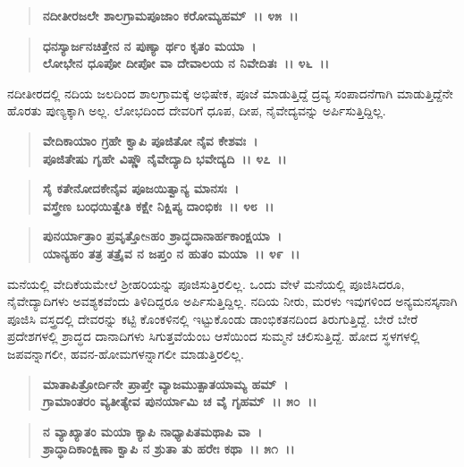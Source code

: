 \begin{verse}
\textbf{ನದೀತೀರಜಲೇ ಶಾಲಗ್ರಾಮಪೂಜಾಂ ಕರೋಮ್ಯಹಮ್~।। ೪೫~।।} 
\end{verse}

\begin{verse}
\textbf{ಧನಸ್ಯಾರ್ಜನಚಿತ್ತೇನ ನ ಪುಣ್ಯಾ ರ್ಥಂ ಕೃತಂ ಮಯಾ~।}\\\textbf{ಲೋಭೇನ ಧೂಪೋ ದೀಪೋ ವಾ ದೇವಾಲಯ ನ ನಿವೇದಿತಃ~।। ೪೬~।।}
\end{verse}

ನದೀತೀರದಲ್ಲಿ ನದಿಯ ಜಲದಿಂದ ಶಾಲಗ್ರಾಮಕ್ಕೆ ಅಭಿಷೇಕ, ಪೂಜೆ ಮಾಡುತ್ತಿದ್ದೆ ದ್ರವ್ಯ ಸಂಪಾದನೆಗಾಗಿ ಮಾಡುತ್ತಿದ್ದೆನೇ ಹೊರತು ಪುಣ್ಯಕ್ಕಾಗಿ ಅಲ್ಲ. ಲೋಭದಿಂದ ದೇವರಿಗೆ ಧೂಪ, ದೀಪ, ನೈವೇದ್ಯವನ್ನು ಅರ್ಪಿಸುತ್ತಿದ್ದಿಲ್ಲ.

\begin{verse}
\textbf{ವೇದಿಕಾಯಾಂ ಗ್ರಹೇ ಕ್ವಾಪಿ ಪೂಜಿತೋ ನೈವ ಕೇಶವಃ~।}\\\textbf{ಪೂಜಿತೇಷು ಗೃಹೇ ವಿಷ್ಣೌ ನೈವೇದ್ಯಾದಿ ಭವೇದ್ಯದಿ~।। ೪೭~।। }
\end{verse}

\begin{verse}
\textbf{ಸೈ ಕತೇನೋದಕೇನೈವ ಪೂಜಯಿತ್ವಾನ್ಯ ಮಾನಸಃ~।}\\\textbf{ವಸ್ತ್ರೇಣ ಬಂಧಯಿತ್ವೇತಿ ಕಕ್ಷೇ ನಿಕ್ಷಿಪ್ಯ ದಾಂಭಿಕಃ~।। ೪೮~।। }
\end{verse}

\begin{verse}
\textbf{ಪುನರ್ಯಾತ್ರಾಂ ಪ್ರವೃತ್ತೋsಹಂ ಶ್ರಾದ್ಧದಾನಾರ್ಹಕಾಂಕ್ಷಯಾ~।}\\\textbf{ಯಾನ್ಯಹಂ ತತ್ರ ತತ್ರೈವ ನ ಜಪ್ತಂ ನ ಹುತಂ ಮಯಾ~।। ೪೯~।।}
\end{verse}

ಮನೆಯಲ್ಲಿ ವೇದಿಕೆಯಮೇಲೆ ಶ‍್ರೀಹರಿಯನ್ನು ಪೂಜಿಸುತ್ತಿರಲಿಲ್ಲ. ಒಂದು ವೇಳೆ ಮನೆಯಲ್ಲಿ ಪೂಜಿಸಿದರೂ, ನೈವೇದ್ಯಾದಿಗಳು ಅವಶ್ಯಕವೆಂದು ತಿಳಿದಿದ್ದರೂ ಅರ್ಪಿಸುತ್ತಿದ್ದಿಲ್ಲ. ನದಿಯ ನೀರು, ಮರಳು ಇವುಗಳಿಂದ ಅನ್ಯಮನಸ್ಕನಾಗಿ ಪೂಜಿಸಿ ವಸ್ತ್ರದಲ್ಲಿ ದೇವರನ್ನು ಕಟ್ಟಿ ಕೊಂಕಳಿನಲ್ಲಿ ಇಟ್ಟುಕೊಂಡು ಡಾಂಭಿಕತನದಿಂದ ತಿರುಗುತ್ತಿದ್ದೆ. ಬೇರೆ ಬೇರೆ ಪ್ರದೇಶಗಳಲ್ಲಿ ಶ್ರಾದ್ಧದ ದಾನಾದಿಗಳು ಸಿಗುತ್ತವೆಯೆಂಬ ಆಸೆಯಿಂದ ಸುಮ್ಮನೆ ಚಲಿಸುತ್ತಿದ್ದೆ. ಹೋದ ಸ್ಥಳಗಳಲ್ಲಿ ಜಪವನ್ನಾಗಲೀ, ಹವನ-ಹೋಮಗಳನ್ನಾಗಲೀ ಮಾಡುತ್ತಿರಲಿಲ್ಲ.

\begin{verse}
\textbf{ಮಾತಾಪಿತ್ರೋರ್ದಿನೇ ಪ್ರಾಪ್ತೇ ವ್ಯಾಜಮುತ್ಪಾತಯಾಮ್ಯ ಹಮ್~।}\\\textbf{ಗ್ರಾಮಾಂತರಂ ವ್ಯತೀತ್ಯೇವ ಪುನರ್ಯಾಮಿ ಚ ವೈ ಗೃಹಮ್~।। ೫೦~।।} 
\end{verse}

\begin{verse}
\textbf{ನ ವ್ಯಾಖ್ಯಾತಂ ಮಯಾ ಕ್ಯಾಪಿ ನಾಧ್ಯಾಪಿತಮಥಾಪಿ ವಾ~।}\\\textbf{ಶ್ರಾದ್ಧಾದಿಕಾಂಕ್ಷಿಣಾ ಕ್ವಾಪಿ ನ ಶ್ರುತಾ ತು ಹರೇಃ ಕಥಾ~।। ೫೧~।। }
\end{verse}

